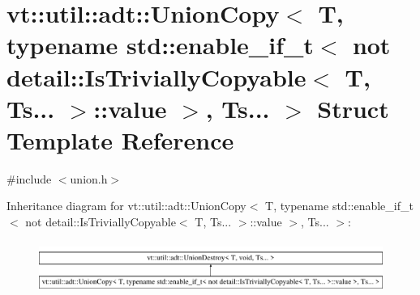 \hypertarget{structvt_1_1util_1_1adt_1_1_union_copy_3_01_t_00_01typename_01std_1_1enable__if__t_3_01not_01det4a1e3b5522a7a77cb5d4fb8991a6197b}{}\section{vt\+:\+:util\+:\+:adt\+:\+:Union\+Copy$<$ T, typename std\+:\+:enable\+\_\+if\+\_\+t$<$ not detail\+:\+:Is\+Trivially\+Copyable$<$ T, Ts... $>$\+:\+:value $>$, Ts... $>$ Struct Template Reference}
\label{structvt_1_1util_1_1adt_1_1_union_copy_3_01_t_00_01typename_01std_1_1enable__if__t_3_01not_01det4a1e3b5522a7a77cb5d4fb8991a6197b}


{\ttfamily \#include $<$union.\+h$>$}

Inheritance diagram for vt\+:\+:util\+:\+:adt\+:\+:Union\+Copy$<$ T, typename std\+:\+:enable\+\_\+if\+\_\+t$<$ not detail\+:\+:Is\+Trivially\+Copyable$<$ T, Ts... $>$\+:\+:value $>$, Ts... $>$\+:\begin{figure}[H]
\begin{center}
\leavevmode
\includegraphics[height=1.717791cm]{structvt_1_1util_1_1adt_1_1_union_copy_3_01_t_00_01typename_01std_1_1enable__if__t_3_01not_01det4a1e3b5522a7a77cb5d4fb8991a6197b}
\end{center}
\end{figure}
